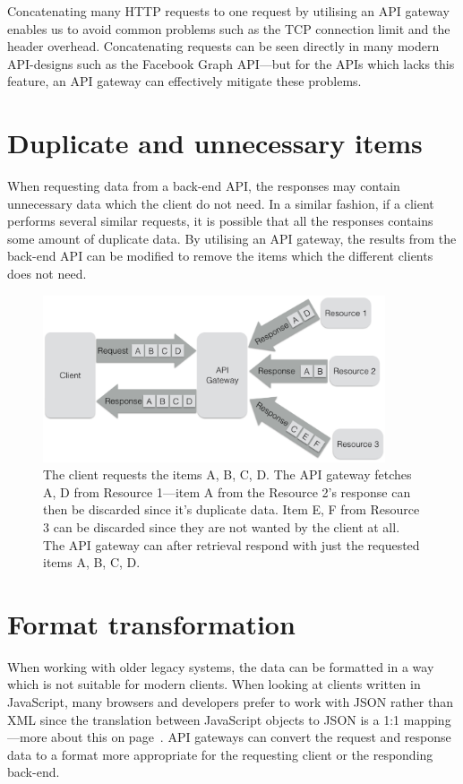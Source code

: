 \documentclass{cslthse-msc}
\begin{document}
Concatenating many HTTP requests to one request by utilising an API gateway enables us to avoid common problems such as the TCP connection limit and the header overhead. Concatenating requests can be seen directly in many modern API-designs such as the Facebook Graph API\cite{facebook_batch_requests}---but for the APIs which lacks this feature, an API gateway can effectively mitigate these problems.

\section{Duplicate and unnecessary items}
When requesting data from a back-end API, the responses may contain unnecessary data which the client do not need. In a similar fashion, if a client performs several similar requests, it is possible that all the responses contains some amount of duplicate data. By utilising an API gateway, the results from the back-end API can be modified to remove the items which the different clients does not need.

\begin{figure}[H]
  \centering
    \begin{center}
      \includegraphics[width=0.9\textwidth]{images/api_gateway_duplicate.png}
    \end{center}
  \caption{The client requests the items A, B, C, D. The API gateway fetches A, D from Resource 1---item A from the Resource 2's response can then be discarded since it's duplicate data. Item E, F from Resource 3 can be discarded since they are not wanted by the client at all. The API gateway can after retrieval respond with just the requested items A, B, C, D.}
\end{figure}

\section{Format transformation}
When working with older legacy systems, the data can be formatted in a way which is not suitable for modern clients. When looking at clients written in JavaScript, many browsers and developers prefer to work with JSON rather than XML since the translation between JavaScript objects to JSON is a 1:1 mapping---more about this on page~\pageref{xml_json}. API gateways can convert the request and response data to a format more appropriate for the requesting client or the responding back-end.
\end{document}
